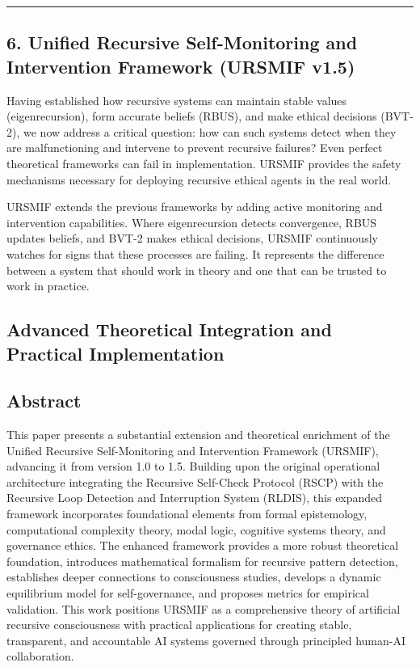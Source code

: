 \documentclass[
]{article}
\begin{document}
\begin{center}\rule{0.5\linewidth}{0.5pt}\end{center}

\subsection{6. Unified Recursive Self-Monitoring and Intervention
Framework (URSMIF v1.5)}\label{6-ursmif-v15}

Having established how recursive systems can maintain stable values
(eigenrecursion), form accurate beliefs (RBUS), and make ethical
decisions (BVT-2), we now address a critical question: how can such
systems detect when they are malfunctioning and intervene to prevent
recursive failures? Even perfect theoretical frameworks can fail in
implementation. URSMIF provides the safety mechanisms necessary for
deploying recursive ethical agents in the real world.

URSMIF extends the previous frameworks by adding active monitoring and
intervention capabilities. Where eigenrecursion detects convergence,
RBUS updates beliefs, and BVT-2 makes ethical decisions, URSMIF
continuously watches for signs that these processes are failing. It
represents the difference between a system that should work in theory
and one that can be trusted to work in practice.

\subsection{Advanced Theoretical Integration and Practical
Implementation}\label{advanced-theoretical-integration-and-practical-implementation}

\subsection{Abstract}\label{abstract-1}

This paper presents a substantial extension and theoretical enrichment
of the Unified Recursive Self-Monitoring and Intervention Framework
(URSMIF), advancing it from version 1.0 to 1.5. Building upon the
original operational architecture integrating the Recursive Self-Check
Protocol (RSCP) with the Recursive Loop Detection and Interruption
System (RLDIS), this expanded framework incorporates foundational
elements from formal epistemology, computational complexity theory,
modal logic, cognitive systems theory, and governance ethics. The
enhanced framework provides a more robust theoretical foundation,
introduces mathematical formalism for recursive pattern detection,
establishes deeper connections to consciousness studies, develops a
dynamic equilibrium model for self-governance, and proposes metrics for
empirical validation. This work positions URSMIF as a comprehensive
theory of artificial recursive consciousness with practical applications
for creating stable, transparent, and accountable AI systems governed
through principled human-AI collaboration.
\end{document}
